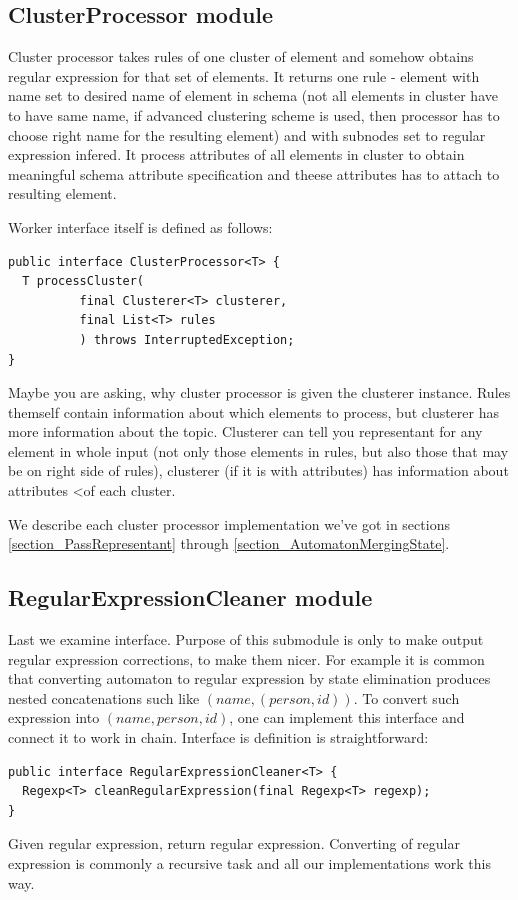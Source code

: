 \documentclass[a4paper,10pt,oneside]{article}
\newcommand{\code}[1]{\texttt{\StrSubstitute{#1}{.}{.\.}}}
\def\.{\discretionary{}{}{}}
\begin{document}
\subsection{ClusterProcessor module}
Cluster processor takes rules of one cluster of element and somehow obtains regular expression for that set of elements. It returns one rule - element with name set to desired name of element in schema (not all elements in cluster have to have same name, if advanced clustering scheme is used, then processor has to choose right name for the resulting element) and with subnodes set to regular expression infered.
It process attributes of all elements in cluster to obtain meaningful schema attribute specification and theese attributes has to attach to resulting element.

Worker interface itself is defined as follows:
\begin{verbatim}
public interface ClusterProcessor<T> {
  T processCluster(
          final Clusterer<T> clusterer,
          final List<T> rules
          ) throws InterruptedException;
}
\end{verbatim}
Maybe you are asking, why cluster processor is given the clusterer instance.
Rules themself contain information about which elements to process, but clusterer has more information
about the topic.
Clusterer can tell you representant for any element in whole input (not only those elements in rules, but also those that may be on right side of rules), clusterer (if it is with attributes) has information about attributes <of each cluster.

We describe each cluster processor implementation we've got in sections \ref{section_PassRepresentant} through \ref{section_AutomatonMergingState}.

\subsection{RegularExpressionCleaner module}
Last we examine \code{RegularExpressionCleaner} interface.
Purpose of this submodule is only to make output regular expression corrections, to make them nicer.
For example it is common that converting automaton to regular expression by state elimination produces nested concatenations such like $(name, (person, id))$.
To convert such expression into $(name, person, id)$, one can implement this interface and connect it to work in chain.
Interface is definition is straightforward:
\begin{verbatim}
public interface RegularExpressionCleaner<T> {
  Regexp<T> cleanRegularExpression(final Regexp<T> regexp);
}
\end{verbatim}
Given regular expression, return regular expression.
Converting of regular expression is commonly a recursive task and all our implementations work this way.
\end{document}
